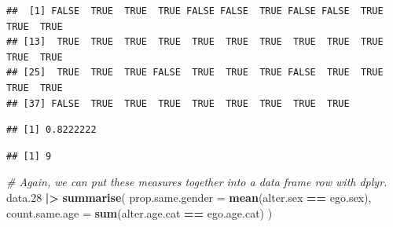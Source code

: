 \documentclass[
]{book}
\newenvironment{Shaded}{\begin{snugshade}}{\end{snugshade}}
\newcommand{\AttributeTok}[1]{\textcolor[rgb]{0.13,0.29,0.53}{#1}}
\newcommand{\CommentTok}[1]{\textcolor[rgb]{0.56,0.35,0.01}{\textit{#1}}}
\newcommand{\FloatTok}[1]{\textcolor[rgb]{0.00,0.00,0.81}{#1}}
\newcommand{\FunctionTok}[1]{\textcolor[rgb]{0.13,0.29,0.53}{\textbf{#1}}}
\newcommand{\NormalTok}[1]{#1}
\newcommand{\SpecialCharTok}[1]{\textcolor[rgb]{0.81,0.36,0.00}{\textbf{#1}}}
\begin{document}
\begin{Shaded}
\end{Shaded}

\begin{verbatim}
##  [1] FALSE  TRUE  TRUE  TRUE FALSE FALSE  TRUE FALSE FALSE  TRUE  TRUE  TRUE
## [13]  TRUE  TRUE  TRUE  TRUE  TRUE  TRUE  TRUE  TRUE  TRUE  TRUE  TRUE  TRUE
## [25]  TRUE  TRUE  TRUE FALSE  TRUE  TRUE  TRUE FALSE  TRUE  TRUE  TRUE  TRUE
## [37] FALSE  TRUE  TRUE  TRUE  TRUE  TRUE  TRUE  TRUE  TRUE
\end{verbatim}

\begin{Shaded}
\end{Shaded}

\begin{verbatim}
## [1] 0.8222222
\end{verbatim}

\begin{Shaded}
\end{Shaded}

\begin{verbatim}
## [1] 9
\end{verbatim}

\begin{Shaded}
\begin{Highlighting}[]
\CommentTok{\# Again, we can put these measures together into a data frame row with dplyr.}
\NormalTok{data}\FloatTok{.28} \SpecialCharTok{|\textgreater{}}
  \FunctionTok{summarise}\NormalTok{(}
    \AttributeTok{prop.same.gender =} \FunctionTok{mean}\NormalTok{(alter.sex }\SpecialCharTok{==}\NormalTok{ ego.sex), }
    \AttributeTok{count.same.age =} \FunctionTok{sum}\NormalTok{(alter.age.cat }\SpecialCharTok{==}\NormalTok{ ego.age.cat)}
\NormalTok{  )}
\end{Highlighting}
\end{Shaded}
\end{document}
